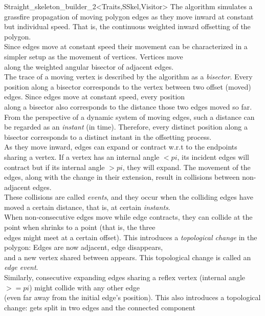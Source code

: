 \begin{ccRefClass}{Straight_skeleton_builder_2<Traits,SSkel,Visitor>}
The algorithm simulates a grassfire propagation of moving polygon edges as they move inward at constant\\
but individual speed. That is, the continuous weighted inward offsetting of the polygon.\\
Since edges move at constant speed their movement can be characterized in a simpler setup as the movement of vertices. Vertices move\\ 
along the weighted angular bisector of adjacent edges.\\
The trace of a moving vertex is described by the algorithm as a {\em bisector}. 
Every position along a bisector corresponds to the vertex between two offset (moved) edges. Since edges move at constant speed, every position\\
along a bisector also corresponds to the distance those two edges moved so far.\\
From the perspective of a dynamic system of moving edges, such a distance can be regarded as an 
{\em instant} (in time). Therefore, every distinct position along a bisector corresponds to a distinct instant in the offsetting process.\\
As they move inward, edges can expand or contract w.r.t to the endpoints sharing a vertex. If a vertex has an internal angle $<pi$, its incident edges will\\
contract but if its internal angle $>pi$, they will expand. The movement of the edges, along with the change in their extension, result in collisions between non-adjacent edges.\\
These collisions are called {\em events}, and they occur when the colliding edges have moved a certain distance, that is, at certain \textit{instants}.\\
When non-consecutive edges  move while edge  contracts, they can collide at the point when  shrinks to a point (that is, the three\\
edges might meet at a certain offset). This introduces a \textit{topological change} in the polygon: Edges  are now adjacent, edge  disappears,\\
and a new vertex shared between  appears. This topological change is called an {\em edge event}.\\
Similarly, consecutive expanding edges  sharing a reflex vertex (internal angle $>=pi$) might collide with any other edge \\
(even far away from the initial edge's position). This also introduces a topological change:  gets split in two edges and the connected component\\

\end{ccRefClass}
